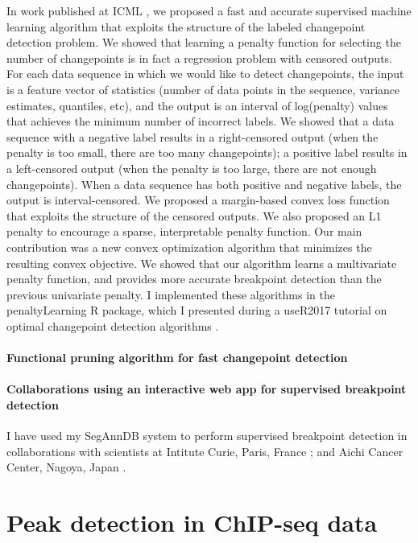 \documentclass{article}
\begin{document}
In work published at ICML \citep{HOCKING-penalties}, we proposed a
fast and accurate supervised machine learning algorithm that exploits
the structure of the labeled changepoint detection problem. We showed
that learning a penalty function for selecting the number of
changepoints is in fact a regression problem with censored
outputs. For each data sequence in which we would like to detect
changepoints, the input is a feature vector of statistics (number of
data points in the sequence, variance estimates, quantiles, etc), and
the output is an interval of log(penalty) values that achieves the
minimum number of incorrect labels. We showed that a data sequence
with a negative label results in a right-censored output (when the
penalty is too small, there are too many changepoints); a positive
label results in a left-censored output (when the penalty is too
large, there are not enough changepoints). When a data sequence has
both positive and negative labels, the output is interval-censored.
We proposed a margin-based convex loss function that exploits the
structure of the censored outputs. We also proposed an L1 penalty to
encourage a sparse, interpretable penalty function. Our main
contribution was a new convex optimization algorithm that minimizes
the resulting convex objective. We showed that our algorithm learns a
multivariate penalty function, and provides more accurate breakpoint
detection than the previous univariate penalty. I implemented these
algorithms in the penaltyLearning R package, which I presented during
a useR2017 tutorial on optimal changepoint detection algorithms
\citep{change-tutorial}.


\paragraph{Functional pruning algorithm for fast changepoint detection} \citep{fpop}


\paragraph{Collaborations using an interactive web app for supervised breakpoint detection} I have used my SegAnnDB system to perform
supervised breakpoint detection in collaborations with scientists at
Intitute Curie, Paris, France \citep{Chicard}; and Aichi Cancer
Center, Nagoya, Japan \citep{Hocking-Leukemia-2016}.

\section{Peak detection in ChIP-seq data}
\end{document}
